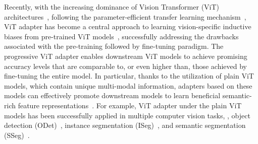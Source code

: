 Recently, with the increasing dominance of Vision Transformer (ViT) architectures~\citep{han2022survey,liu2021swin,khan2022transformers}, following the parameter-efficient transfer learning mechanism~\citep{houlsby2019parameter}, ViT adapter has become a central approach to learning vision-specific inductive biases from pre-trained ViT models~\citep{hu2022lora,jie2023fact,chen2022vision,ma2024segment,luo2023forgery,shao2023deepfake}, successfully addressing the drawbacks associated with the pre-training followed by fine-tuning paradigm.
%
The progressive ViT adapter enables downstream ViT models to achieve promising accuracy levels that are comparable to, or even higher than, those achieved by fine-tuning the entire model. 
In particular, thanks to the utilization of plain ViT models, which contain unique multi-modal information, adapters based on these models can effectively promote downstream models to learn beneficial semantic-rich feature representations~\citep{touvron2021training,hu2022lora,Kirillov_2023_ICCV,dosovitskiy2020image}. For example, ViT adapter under the plain ViT models has been successfully applied in multiple computer vision tasks, \eg,
object detection (ODet)~\citep{li2022exploring}, instance segmentation (ISeg)~\citep{liu2024revisiting}, and semantic segmentation (SSeg)~\citep{xie2021segformer}.

